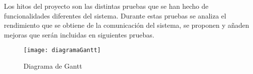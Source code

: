Los hitos del proyecto son las distintas pruebas que se han hecho de funcionalidades diferentes del sistema. Durante estas pruebas se analiza el rendimiento que se obtiene de la comunicación del sistema, se proponen y añaden mejoras que serán incluidas en siguientes pruebas.

\begin{figure}[t]
	 {
	\texttt{[image: diagramaGantt]}
	}
	\caption{Diagrama de Gantt}
	\label{fig:gantt}
\end{figure}

